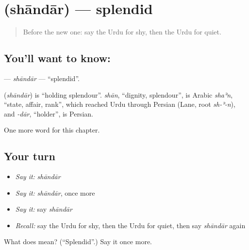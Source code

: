 \section[\texorpdfstring{\ur{شاندار} (shāndār)}{شاندار (shāndār)}]{ (shāndār) — splendid}

\label{lesson:UR-C221-shandar}



\begin{quote}
Before the new one: say the Urdu for shy, then the Urdu for quiet.
\end{quote}

\subsection*{You'll want to know: }
\textbf{} — \emph{shāndār} — \textquotedblleft{}splendid\textquotedblright{}.

\begin{cousinweb}
\textbf{} (\emph{shāndār}) is \textquotedblleft{}holding splendour\textquotedblright{}. \emph{shān}, \textquotedblleft{}dignity, splendour\textquotedblright{}, is Arabic \emph{shaʾn}, \textquotedblleft{}state, affair, rank\textquotedblright{}, which reached Urdu through Persian (Lane, root \emph{sh-ʾ-n}), and \emph{-dār}, \textquotedblleft{}holder\textquotedblright{}, is Persian.
\end{cousinweb}

\begin{grammarlens}[title={What you've built}]
One more word for this chapter.
\end{grammarlens}

\subsection*{Your turn}
\begin{itemize}
\raggedright
  \item \emph{Say it:} \emph{shāndār}
  \item \emph{Say it:} \emph{shāndār}, once more
  \item \emph{Say it:} say \emph{shāndār}
  \item \emph{Recall:} say the Urdu for shy, then the Urdu for quiet, then say \emph{shāndār} again
\end{itemize}

\begin{tcolorbox}[breakable,colback=teal!4,colframe=teal!35!black,title={Before you move on}]
What does  mean? (\textquotedblleft{}Splendid\textquotedblright{}.) Say it once more.
\end{tcolorbox}
